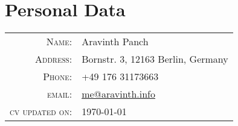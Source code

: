 \section{Personal Data}
\begin{tabular}
	{rl}
	\textsc{Name:} &  Aravinth Panch \\
	\textsc{Address:} & Bornstr. 3, 12163 Berlin, Germany\\
	\textsc{Phone:} & +49 176 31173663\\
	\textsc{email:} & \href{mailto:me@aravinth.info}{me@aravinth.info} \\
	\textsc{cv updated on:} & \today\\
\end{tabular}
